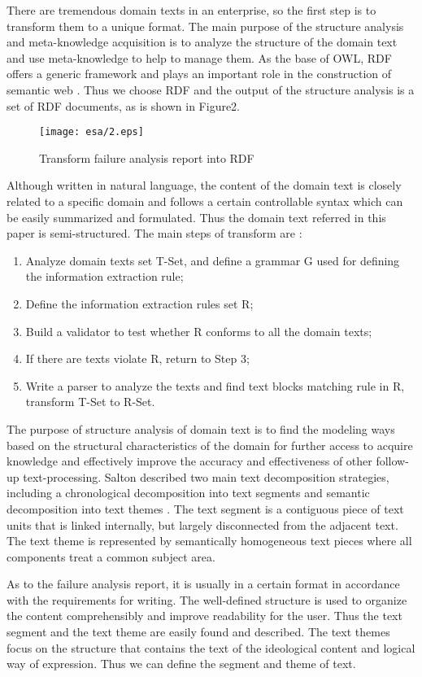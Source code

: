 \documentclass{elsarticle}
\begin{document}
There are tremendous domain texts in an enterprise, so the first step
is to transform them to a unique format. The main purpose of the
structure analysis and meta-knowledge acquisition is to analyze the
structure of the domain text and use meta-knowledge to help to manage
them. As the base of OWL, RDF offers a generic framework and plays an
important role in the construction of semantic web \cite{lassila1999rdf}. Thus we
choose RDF and the output of the structure analysis is a set of RDF
documents, as is shown in Figure2. 
\begin{figure}[htp]
  \centering
  \texttt{[image: esa/2.eps]}

  \caption{Transform failure analysis report into RDF}
  \label{fig:2}
\end{figure}
Although written in natural language, the content of the domain text
is closely related to a specific domain and follows a certain
controllable syntax which can be easily summarized and
formulated. Thus the domain text referred in this paper is
semi-structured. The main steps of transform are \cite{Wang2008}:
\begin{enumerate}
\item Analyze domain texts set T-Set, and define a grammar G used for
defining the information extraction rule;
\item Define the information extraction rules set R;
\item Build a validator to test whether R conforms to all the domain
texts;
\item If there are texts violate R, return to Step 3;
\item Write a parser to analyze the texts and find text blocks
matching rule in R, transform T-Set to R-Set.  
\end{enumerate}


The purpose of structure analysis of domain text is to find the
modeling ways based on the structural characteristics of the domain
for further access to acquire knowledge and effectively improve
the accuracy and effectiveness of other follow-up
text-processing. Salton described two main text decomposition
strategies, including a chronological decomposition into text segments
and semantic decomposition into text themes \cite{234834}. The text segment is
a contiguous piece of text units that is linked internally, but
largely disconnected from the adjacent text. The text theme is
represented by semantically homogeneous text pieces where all
components treat a common subject area.

As to the failure analysis report, it is usually in a certain format
in accordance with the requirements for writing. The well-defined structure is used to organize
the content comprehensibly and improve readability for the user. Thus
the text segment and the text theme are easily found and
described. The text themes focus on the structure that contains the
text of the ideological content and logical way of expression. Thus we
can define the segment and theme of text.
\end{document}
